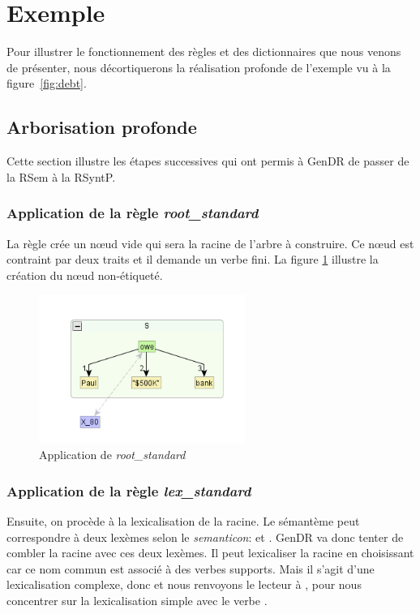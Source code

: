 
\section{Exemple}\label{sec:exemple}

Pour illustrer le fonctionnement des règles et des dictionnaires que nous venons de présenter, nous décortiquerons la réalisation profonde de l'exemple vu à la figure~\ref{fig:debt}.

\subsection{Arborisation profonde}

Cette section illustre les étapes successives qui ont permis à GenDR de passer de la \ac{RSem} à la \ac{RSyntP}.

\subsubsection{Application de la règle \emph{root\_standard}}
La règle crée un n\oe{}ud vide qui sera la racine de l'arbre à construire. Ce n\oe{}ud est contraint par deux traits et il demande un verbe fini. La figure \ref{fig:rootstand} illustre la création du n\oe{}ud non-étiqueté.
\begin{figure}[htb]
	\centering
	\includegraphics[width=0.6\textwidth, trim = {0cm 0cm 0cm 0cm},clip]{ch3/figs/inspecteur_root.png}
	\vspace{-0.5cm}
	\caption{Application de \emph{root\_standard}}
	\label{fig:rootstand}
\end{figure}

\subsubsection{Application de la règle \emph{lex\_standard}}
Ensuite, on procède à la lexicalisation de la racine. Le sémantème  peut correspondre à deux lexèmes selon le \emph{semanticon}:  et . GenDR va donc tenter de combler la racine avec ces deux lexèmes. Il peut lexicaliser la racine en choisissant  car ce nom commun est associé à des verbes supports. Mais il s'agit d'une lexicalisation complexe, donc et nous renvoyons le lecteur à \cite{lambrey15,LambreyImplementationcollocationspour2017,lareau18}, pour nous concentrer sur la lexicalisation simple avec le verbe .

